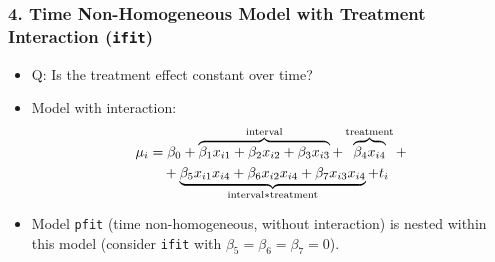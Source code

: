 \documentclass[oneside]{book}\usepackage[]{graphicx}\usepackage[svgnames]{xcolor}
\let\log\relax%
\begin{document}
\subsubsection*{4. Time Non-Homogeneous Model with Treatment Interaction (\texttt{ifit})}
\begin{itemize}
    \item Q: Is the treatment effect constant over time?
    \item Model with interaction:
          \textcolor{Green}{\begin{align*}
                  \log{\mu_i}
                   & =\beta_0+\overbrace{\beta_1x_{i1}+\beta_2x_{i2}+\beta_3x_{i3}}^{\text{interval}}+\overbrace{\beta_4x_{i4}}^{\text{treatment}}+ \\
                   & \quad +\underbrace{\beta_5x_{i1}x_{i4}+\beta_6x_{i2}x_{i4}+\beta_7x_{i3}x_{i4}}_{\text{interval$*$treatment}}+\log{t_i}
              \end{align*}}
    \item Model \texttt{pfit} (time non-homogeneous, without interaction) is nested within this
          model (consider \texttt{ifit} with $ \beta_5=\beta_6=\beta_7=0 $).
\end{itemize}
\end{document}
